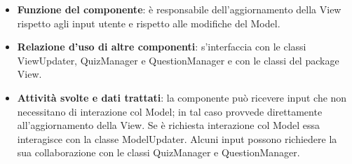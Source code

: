 \documentclass[a4paper,11pt]{article}
\begin{document}
			\begin{itemize}
				\item\textbf{Funzione del componente}: è responsabile dell'aggiornamento della View rispetto agli input utente e rispetto alle modifiche del Model.
				\item\textbf{Relazione d'uso di altre componenti}: s'interfaccia con le classi ViewUpdater, QuizManager e QuestionManager e con le classi del package View.
				\item\textbf{Attività svolte e dati trattati}: la componente può ricevere input che non necessitano di interazione col Model; in tal caso provvede direttamente all'aggiornamento della View. Se è richiesta interazione col Model essa interagisce con la classe ModelUpdater. Alcuni input possono richiedere la sua collaborazione con le classi QuizManager e QuestionManager.
			\end{itemize}
			\newpage
			
\end{document}
